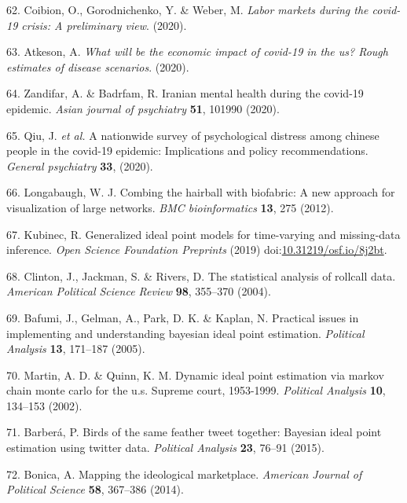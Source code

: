 \documentclass[]{article}
\begin{document}
\begin{cslreferences}
\leavevmode\hypertarget{ref-coibion2020labor}{}%
62. Coibion, O., Gorodnichenko, Y. \& Weber, M. \emph{Labor markets during the covid-19 crisis: A preliminary view}. (2020).

\leavevmode\hypertarget{ref-atkeson2020will}{}%
63. Atkeson, A. \emph{What will be the economic impact of covid-19 in the us? Rough estimates of disease scenarios}. (2020).

\leavevmode\hypertarget{ref-zandifar2020iranian}{}%
64. Zandifar, A. \& Badrfam, R. Iranian mental health during the covid-19 epidemic. \emph{Asian journal of psychiatry} \textbf{51}, 101990 (2020).

\leavevmode\hypertarget{ref-qiu2020nationwide}{}%
65. Qiu, J. \emph{et al.} A nationwide survey of psychological distress among chinese people in the covid-19 epidemic: Implications and policy recommendations. \emph{General psychiatry} \textbf{33}, (2020).

\leavevmode\hypertarget{ref-longabaugh2012}{}%
66. Longabaugh, W. J. Combing the hairball with biofabric: A new approach for visualization of large networks. \emph{BMC bioinformatics} \textbf{13}, 275 (2012).

\leavevmode\hypertarget{ref-kubinec2019ideal}{}%
67. Kubinec, R. Generalized ideal point models for time-varying and missing-data inference. \emph{Open Science Foundation Preprints} (2019) doi:\href{https://doi.org/10.31219/osf.io/8j2bt}{10.31219/osf.io/8j2bt}.

\leavevmode\hypertarget{ref-jackman2004}{}%
68. Clinton, J., Jackman, S. \& Rivers, D. The statistical analysis of rollcall data. \emph{American Political Science Review} \textbf{98}, 355--370 (2004).

\leavevmode\hypertarget{ref-gelman2005}{}%
69. Bafumi, J., Gelman, A., Park, D. K. \& Kaplan, N. Practical issues in implementing and understanding bayesian ideal point estimation. \emph{Political Analysis} \textbf{13}, 171--187 (2005).

\leavevmode\hypertarget{ref-quinn2002}{}%
70. Martin, A. D. \& Quinn, K. M. Dynamic ideal point estimation via markov chain monte carlo for the u.s. Supreme court, 1953-1999. \emph{Political Analysis} \textbf{10}, 134--153 (2002).

\leavevmode\hypertarget{ref-barbera2015}{}%
71. Barberá, P. Birds of the same feather tweet together: Bayesian ideal point estimation using twitter data. \emph{Political Analysis} \textbf{23}, 76--91 (2015).

\leavevmode\hypertarget{ref-bonica2014}{}%
72. Bonica, A. Mapping the ideological marketplace. \emph{American Journal of Political Science} \textbf{58}, 367--386 (2014).


\end{cslreferences}
\end{document}

